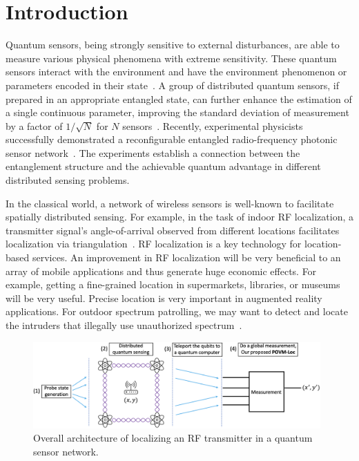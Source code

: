 \section{Introduction}



Quantum sensors, being strongly sensitive to external disturbances, are able to measure various physical phenomena with extreme sensitivity.
These quantum sensors interact with the environment and have the environment phenomenon or parameters encoded in their state~\cite{RevModPhys.quantumsensing}.
A group of distributed quantum sensors, if prepared in an appropriate entangled state, can further enhance the estimation of a single continuous parameter, improving the standard deviation of measurement by a factor of $1/\sqrt{N}$ for $N$ sensors~\cite{Giovannetti_2011}.
Recently, experimental physicists successfully demonstrated a reconfigurable entangled radio-frequency photonic sensor network~\cite{PRL20-qsn,arizona21-thesis}.
The experiments establish a connection between the entanglement structure and the achievable quantum advantage in different distributed sensing problems.

In the classical world, a network of wireless sensors is well-known to facilitate spatially distributed sensing.
For example, in the task of indoor RF localization, a transmitter signal's angle-of-arrival observed from different locations facilitates localization via triangulation~\cite{nsdi13-arraytrack}.
RF localization is a key technology for location-based services.
An improvement in RF localization will be very beneficial to an array of mobile applications and thus generate huge economic effects.
For example, getting a fine-grained location in supermarkets, libraries, or museums will be very useful.
Precise location is very important in augmented reality applications.
For outdoor spectrum patrolling, we may want to detect and locate the intruders that illegally use unauthorized spectrum~\cite{infocom18-spectrum}.



\begin{figure}[t]
    \centering
    \includegraphics[width=0.98\textwidth]{chapters/qce/figures/overall.png}
    \caption{Overall architecture of localizing an RF transmitter in a quantum sensor network.}
    \label{fig:quantumoverall}
\end{figure}


